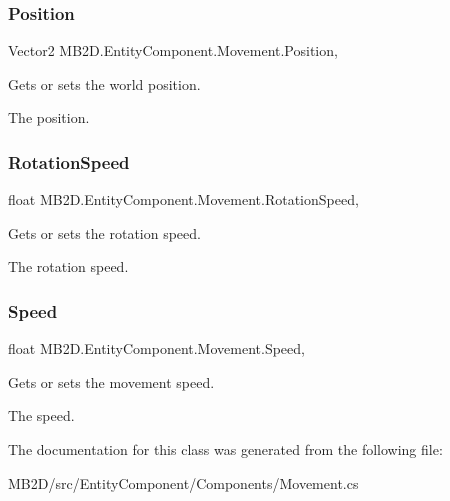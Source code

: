 \subsubsection{\texorpdfstring{Position}{Position}}
{\footnotesize\ttfamily Vector2 M\+B2\+D.\+Entity\+Component.\+Movement.\+Position\hspace{0.3cm}{\ttfamily [get]}, {\ttfamily [set]}}



Gets or sets the world position. 

The position.\hypertarget{class_m_b2_d_1_1_entity_component_1_1_movement_ae46e6d4afde985b6afe55b83ae1297a3}{}\label{class_m_b2_d_1_1_entity_component_1_1_movement_ae46e6d4afde985b6afe55b83ae1297a3} 
\subsubsection{\texorpdfstring{Rotation\+Speed}{RotationSpeed}}
{\footnotesize\ttfamily float M\+B2\+D.\+Entity\+Component.\+Movement.\+Rotation\+Speed\hspace{0.3cm}{\ttfamily [get]}, {\ttfamily [set]}}



Gets or sets the rotation speed. 

The rotation speed.\hypertarget{class_m_b2_d_1_1_entity_component_1_1_movement_aef220a1d502b303764058f3d11517bdf}{}\label{class_m_b2_d_1_1_entity_component_1_1_movement_aef220a1d502b303764058f3d11517bdf} 
\subsubsection{\texorpdfstring{Speed}{Speed}}
{\footnotesize\ttfamily float M\+B2\+D.\+Entity\+Component.\+Movement.\+Speed\hspace{0.3cm}{\ttfamily [get]}, {\ttfamily [set]}}



Gets or sets the movement speed. 

The speed.

The documentation for this class was generated from the following file\+:\begin{DoxyCompactItemize}
\item 
M\+B2\+D/src/\+Entity\+Component/\+Components/Movement.\+cs\end{DoxyCompactItemize}
